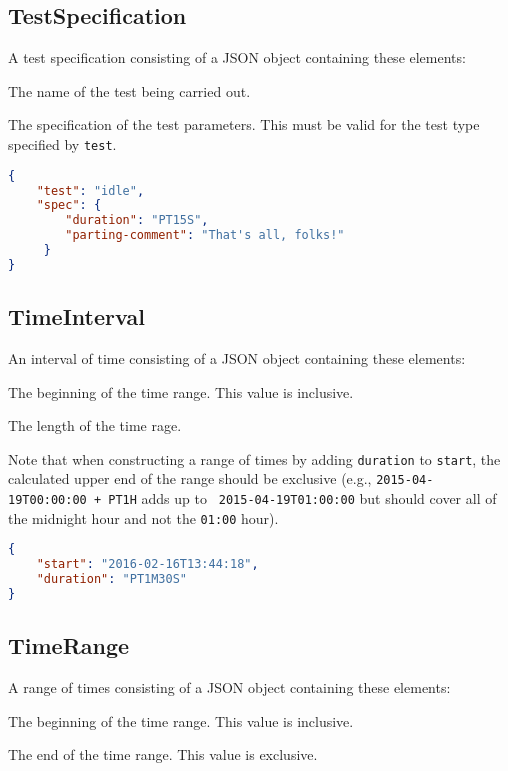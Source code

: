 \documentclass[10pt]{article}
\begin{document}
\subsection{TestSpecification}
A test specification consisting of a JSON object containing these
elements:

 The name of the test being carried out.

 The specification of the test parameters.
This must be valid for the test type specified by {\tt test}.

\example
\begin{lstlisting}[language=json]
{
    "test": "idle",
    "spec": {
        "duration": "PT15S",
        "parting-comment": "That's all, folks!"
     }
}
\end{lstlisting}




\subsection{TimeInterval}
An interval of time consisting of a JSON object containing these
elements:

 The beginning of the time range.  This
value is inclusive.

 The length of the time rage.

Note that when constructing a range of times by adding {\tt duration}
to {\tt start}, the calculated upper end of the range should be
exclusive (e.g., {\tt 2015-04-19T00:00:00 + PT1H} adds up to {\tt
  2015-04-19T01:00:00} but should cover all of the midnight hour and
not the {\tt 01:00} hour).

\example
\begin{lstlisting}[language=json]
{
    "start": "2016-02-16T13:44:18",
    "duration": "PT1M30S"
}
\end{lstlisting}


\subsection{TimeRange}
A range of times consisting of a JSON object containing these
elements:

 The beginning of the time range.  This
value is inclusive.

 The end of the time range.  This
value is exclusive.
\end{document}
